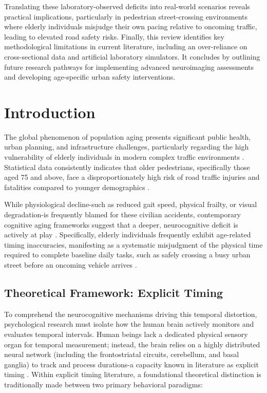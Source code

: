 \documentclass{custom_report}
\begin{document}
Translating these laboratory-observed deficits into real-world scenarios reveals practical implications, particularly in pedestrian street-crossing environments where elderly individuals misjudge their own pacing relative to oncoming traffic, leading to elevated road safety risks. Finally, this review identifies key methodological limitations in current literature, including an over-reliance on cross-sectional data and artificial laboratory simulators. It concludes by outlining future research pathways for implementing advanced neuroimaging assessments and developing age-specific urban safety interventions.

\newpage
\tableofcontents
\newpage


\chapter{Introduction}
\label{ch:introduction}

The global phenomenon of population aging presents significant public health, urban planning, and infrastructure challenges, particularly regarding the high vulnerability of elderly individuals in modern complex traffic environments \cite{Zivotofsky2012}. Statistical data consistently indicates that older pedestrians, specifically those aged 75 and above, face a disproportionately high risk of road traffic injuries and fatalities compared to younger demographics \cite{Zivotofsky2012}. 

While physiological decline-such as reduced gait speed, physical frailty, or visual degradation-is frequently blamed for these civilian accidents, contemporary cognitive aging frameworks suggest that a deeper, neurocognitive deficit is actively at play \cite{Carrigan2026}. Specifically, elderly individuals frequently exhibit age-related timing inaccuracies, manifesting as a systematic misjudgment of the physical time required to complete baseline daily tasks, such as safely crossing a busy urban street before an oncoming vehicle arrives \cite{Zivotofsky2012}.

\section{Theoretical Framework: Explicit Timing}
To comprehend the neurocognitive mechanisms driving this temporal distortion, psychological research must isolate how the human brain actively monitors and evaluates temporal intervals. Human beings lack a dedicated physical sensory organ for temporal measurement; instead, the brain relies on a highly distributed neural network (including the frontostriatal circuits, cerebellum, and basal ganglia) to track and process durations-a capacity known in literature as explicit timing \cite{Capizzi2022}. Within explicit timing literature, a foundational theoretical distinction is traditionally made between two primary behavioral paradigms:
\end{document}
